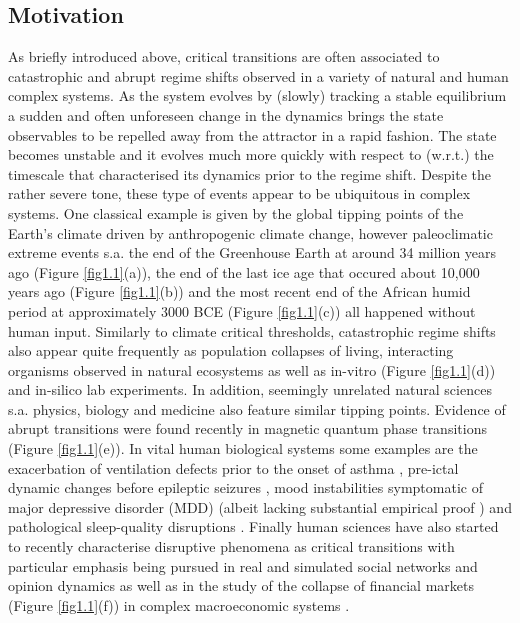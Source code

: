 \documentclass[../main.tex]{subfiles}
\begin{document}
\subsection{Motivation}\label{subsec1.1}
As briefly introduced above, critical transitions are often associated to catastrophic and abrupt regime shifts observed in a variety of natural and human complex systems.
As the system evolves by (slowly) tracking a stable equilibrium a sudden and often unforeseen change in the dynamics brings the state observables to be repelled away from the attractor in a rapid fashion. The state becomes unstable and it evolves much more quickly with respect to (w.r.t.) the timescale that characterised its dynamics prior to the regime shift.
Despite the rather severe tone, these type of events appear to be ubiquitous in complex systems. 
One classical example is given by the global tipping points of the Earth's climate \cite{Lenton11} driven by anthropogenic climate change, however paleoclimatic extreme events \cite{Dakos08} s.a. the end of the Greenhouse Earth at around 34 million years ago (Figure \ref{fig1.1}(a)), the end of the last ice age that occured about 10,000 years ago (Figure \ref{fig1.1}(b)) and the most recent end of the African humid period at approximately 3000 BCE (Figure \ref{fig1.1}(c)) all happened without human input.
Similarly to climate critical thresholds, catastrophic regime shifts also appear quite frequently as population collapses of living, interacting organisms observed in natural ecosystems \cite{Scheffer01} as well as in-vitro (Figure \ref{fig1.1}(d)) and in-silico \cite{Carpenter06} lab experiments.
In addition, seemingly unrelated natural sciences s.a. physics, biology and medicine also feature similar tipping points. 
Evidence of abrupt transitions were found recently in magnetic quantum phase transitions (Figure \ref{fig1.1}(e)).
In vital human biological systems some examples are the exacerbation of ventilation defects prior to the onset of asthma \cite{Venegas05}, pre-ictal dynamic changes before epileptic seizures \cite{Litt01,McSharry03}, mood instabilities symptomatic of major depressive disorder (MDD) \cite{Leemput13} (albeit lacking substantial empirical proof \cite{Bos14}) and pathological sleep-quality disruptions \cite{deMooij20}.
Finally human sciences have also started to recently characterise disruptive phenomena as critical transitions with particular emphasis being pursued in real \cite{Scheffer21} and simulated \cite{Suweis14,Liang17} social networks and opinion dynamics \cite{Brock06} as well as in the study of the collapse of financial markets (Figure \ref{fig1.1}(f)) in complex macroeconomic systems \cite{Kozlowska16,Kai20}.
\end{document}
